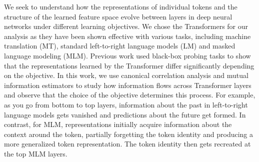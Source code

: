 We seek to understand how the representations of individual tokens and the structure of the learned feature space evolve between layers in deep neural networks under different learning objectives. We chose the Transformers for our analysis as they have been shown effective with various tasks, including machine translation (MT),  standard left-to-right language models (LM) and masked language modeling (MLM).  Previous work used black-box probing tasks to show that the representations learned by the Transformer differ significantly depending on the objective. In this work, we use canonical correlation analysis and mutual information estimators to study how information flows across Transformer layers and observe that the choice of the objective determines this process.  For example, as you go from bottom to top layers, information about the past in left-to-right language models gets vanished and predictions about the future get formed.  In contrast, for MLM,  representations initially acquire information about the context around the token, partially forgetting the token identity and producing a more generalized token representation. The token identity then gets recreated at the top MLM layers.